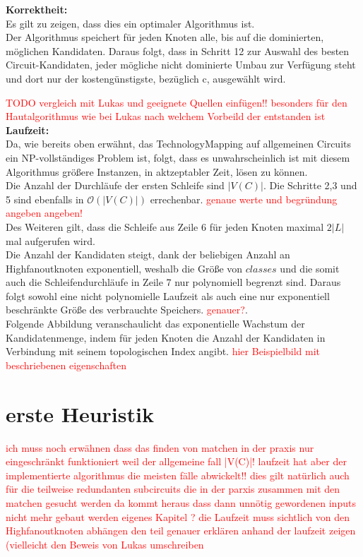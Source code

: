 \documentclass[11pt, a4paper, german]{article}
\newcommand{\TM}{TechnologyMapping }
\begin{document}
{\bf Korrektheit:} \\
Es gilt zu zeigen, dass dies ein optimaler Algorithmus ist. \\
Der Algorithmus speichert für jeden Knoten alle, bis auf die dominierten, möglichen Kandidaten. Daraus folgt, dass in Schritt 12 zur Auswahl des besten Circuit-Kandidaten, jeder mögliche nicht dominierte Umbau zur Verfügung steht und dort nur der kostengünstigste, bezüglich c, ausgewählt wird. 
 
 
 \textcolor{red}{ TODO vergleich mit Lukas und geeignete Quellen einfügen!! besonders für den Hautalgorithmus wie bei Lukas nach welchem Vorbeild der entstanden ist}\\
 
 {\bf Laufzeit:} \\
Da, wie bereits oben erwähnt, das \TM auf allgemeinen Circuits ein NP-vollständiges Problem ist, folgt, dass es unwahrscheinlich ist mit diesem Algorithmus größere Instanzen, in aktzeptabler Zeit, lösen zu können. \\
Die Anzahl der Durchläufe der ersten Schleife sind $|V(C)|$. Die Schritte 2,3 und 5 sind ebenfalls in $\mathcal{O}(|V(C)|)$ errechenbar. \textcolor{red}{genaue werte und begründung angeben angeben!} \\ 
Des Weiteren gilt, dass die Schleife aus Zeile 6 für jeden Knoten maximal $2|L|$ mal aufgerufen wird. \\
Die Anzahl der Kandidaten steigt, dank der beliebigen Anzahl an Highfanoutknoten exponentiell, weshalb die Größe von $classes$ und die somit auch die Schleifendurchläufe in Zeile 7 nur polynomiell begrenzt sind. Daraus folgt sowohl eine nicht polynomielle Laufzeit als auch eine nur exponentiell beschränkte Größe des verbrauchte Speichers. \textcolor{red}{genauer?}.\\

Folgende Abbildung veranschaulicht das exponentielle Wachstum der Kandidatenmenge, indem für jeden Knoten die Anzahl der Kandidaten in Verbindung mit seinem topologischen Index angibt. \textcolor{red}{hier Beispielbild mit beschriebenen eigenschaften} \\

 \section{erste Heuristik}
 \textcolor{red}{ich muss noch erwähnen dass das finden von matchen in der praxis nur eingeschränkt funktioniert weil der allgemeine fall |V(C)|! laufzeit hat aber der implementierte algorithmus die meisten fälle abwickelt!! dies gilt natürlich auch für die teilweise redundanten subcircuits die in der parxis zusammen mit den matchen gesucht werden da kommt heraus dass dann unnötig gewordenen inputs nicht mehr gebaut werden}
 \textcolor{red}{eigenes Kapitel ? die Laufzeit muss sichtlich von den Highfanoutknoten abhängen den teil genauer erklären anhand der laufzeit zeigen (vielleicht den Beweis von Lukas umschreiben}\\
 
\end{document}
